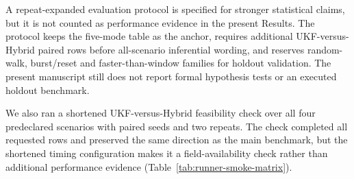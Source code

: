 \documentclass[11pt]{article}
\newcommand{\finalLER}{\texttt{final\_ler\_mean}}
\begin{document}
\begin{table}[t]
\centering
\small
{}
\caption{Supporting-data-backed descriptive UKF-minus-Hybrid advantage margins.
\(\Delta\) is UKF \finalLER{} minus Hybrid-\(b\) \finalLER{}; positive values
therefore indicate lower hybrid \finalLER{}.  The last column divides the mean
paired margin by the larger reported descriptive SD of the UKF and Hybrid-\(b\)
rows in the same scenario.  This is an effect-size-style scale readout for
diagnostic readability only and is not a confidence interval, standard error, \(p\)-value,
significance test, expanded benchmark or hardware measurement.}
\label{tab:ler-advantage-margin}
\end{table}

A repeat-expanded evaluation protocol is specified for stronger
statistical claims, but it is not counted as performance evidence in the
present Results.  The protocol keeps the five-mode table as the anchor,
requires additional UKF-versus-Hybrid paired rows before all-scenario
inferential wording, and reserves random-walk, burst/reset and
faster-than-window families for holdout validation.  The present manuscript
still does not report formal hypothesis tests or an executed holdout benchmark.

We also ran a shortened UKF-versus-Hybrid feasibility check over all four
predeclared scenarios with paired seeds and two repeats.  The check completed
all requested rows and preserved the same direction as the main benchmark, but
the shortened timing configuration makes it a field-availability check rather
than additional performance evidence (Table~\ref{tab:runner-smoke-matrix}).
\end{document}
